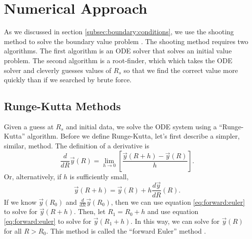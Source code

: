 \documentclass[]{article}
\newcommand{\myvec}[1]{\vec{#1}} %
\newcommand{\dR}[1]{\frac{d #1}{dR}}
\newcommand{\ddR}{\frac{d}{dR}}
\begin{document}

% 
\section{Numerical Approach}
\label{sec:numerical:approach}

As we discussed in section \ref{subsec:boundary:conditions}, we use
the shooting method to solve the boundary value problem
\cite{NumericalRecipes,Heath}. The shooting method requires two
algorithms. The first algorithm is an ODE solver that solves an
initial value problem. The second algorithm is a root-finder, which
which takes the ODE solver and cleverly guesses values of $R_s$ so
that we find the correct value more quickly than if we searched by
brute force.

\subsection{Runge-Kutta Methods}
\label{subsec:runge:kutta}

Given a guess at $R_s$ and initial data, we solve the ODE system using
a ``Runge-Kutta'' algorithm. Before we define Runge-Kutta, let's first
describe a simpler, similar, method. The definition of a derivative is
\begin{equation}
  \label{eq:derivative:definition}
  \ddR\myvec{y}(R) = \lim_{h\to 0}\left[\frac{\myvec{y}(R+h) - \myvec{y}(R)}{h}\right].
\end{equation}
Or, alternatively, if $h$ is sufficiently small,
\begin{equation}
  \label{eq:forward:euler}
  \myvec{y}(R+h) = \myvec{y}(R) + h \dR{\myvec{y}}(R).
\end{equation}
If we know $\myvec{y}(R_0)$ and $\ddR\myvec{y}(R_0)$, then we can use
equation \eqref{eq:forward:euler} to solve for $\myvec{y}(R+h)$. Then,
let $R_1 = R_0 + h$ and use equation \eqref{eq:forward:euler} to solve
for $\myvec{y}(R_1 + h)$. In this way, we can solve for $\myvec{y}(R)$
for all $R > R_0$. This method is called the ``forward Euler'' method
\cite{Heath}.
\end{document}
